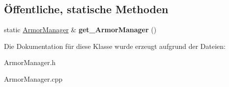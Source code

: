 \subsection*{Öffentliche, statische Methoden}
\begin{DoxyCompactItemize}
\item 
\hypertarget{class_armor_manager_ac2d0437101488564e279661ae9078d5a}{static \hyperlink{class_armor_manager}{Armor\-Manager} \& {\bfseries get\-\_\-\-Armor\-Manager} ()}\label{class_armor_manager_ac2d0437101488564e279661ae9078d5a}

\end{DoxyCompactItemize}


Die Dokumentation für diese Klasse wurde erzeugt aufgrund der Dateien\-:\begin{DoxyCompactItemize}
\item 
Armor\-Manager.\-h\item 
Armor\-Manager.\-cpp\end{DoxyCompactItemize}
